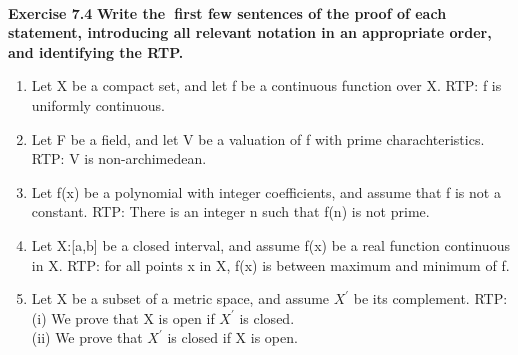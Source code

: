 \documentclass{article}
\begin{document}
    \text{}\\
	\textbf{\large\color{blue} Exercise 7.4} \textbf{Write the first few sentences of the proof of
    each statement, introducing all relevant notation in an
    appropriate order, and identifying the RTP.}\\
	\begin{enumerate}
        \item
        Let X be a compact set, and let f be a continuous function
        over X. RTP: f is uniformly continuous.
        \item
        Let F be a field, and let V be a valuation of f with prime charachteristics. RTP: V is non-archimedean.
        \item
        Let f(x) be a polynomial with integer coefficients, and assume that f is not a
        constant. RTP: There is an integer n such that f(n) is not prime.
        \item
        Let X:[a,b] be a closed interval, and assume f(x) be a real function continuous in X.
        RTP: for all points x in X, f(x) is between maximum and minimum of f.
        \item
        Let X be a subset of a metric space, and assume $X^{'}$ be its complement.
        RTP: (i) We prove that X is open if $X^{'}$ is closed.\\
        (ii) We prove that $X^{'}$ is closed if X is open.
        
    \end{enumerate}
\end{document}
